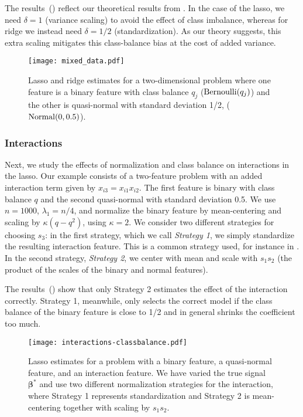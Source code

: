 The results~() reflect our theoretical results from
. In the case of the lasso, we need \(\delta =1\) (variance scaling) to
avoid the effect of class imbalance, whereas for ridge we instead need \(\delta =1/2\)
(standardization). As our theory suggests, this extra scaling mitigates this class-balance
bias at the cost of added variance.

\begin{figure}[htpb]
  \centering
  \texttt{[image: mixed\_data.pdf]}
  \caption{%
    Lasso and ridge estimates for a two-dimensional problem where one feature is a binary
    feature with class balance \(q_j\) (\(\operatorname{Bernoulli}(q_j)\)) and the other is quasi-normal
    with standard deviation 1/2, (\(\operatorname{Normal}(0, 0.5)\)).
  }
  \label{fig:lasso-ridge-comparison}
\end{figure}

\subsubsection{Interactions}\label{sec:experiments-interactions}

Next, we study the effects of normalization and class balance on interactions in the lasso.
Our example consists of a two-feature problem with an added interaction term given by
\(x_{i3} = x_{i1}x_{i2}\). The first feature is binary with class balance \(q\) and the
second quasi-normal with standard deviation 0.5. We use \(n=1000\), \(\lambda_1 = n/4\),
and normalize the binary feature by mean-centering and scaling by \(\kappa (q - q^2)\),
using \(\kappa = 2\). We consider two different strategies for choosing \(s_3\): in the
first strategy, which we call \emph{Strategy 1}, we simply standardize the resulting
interaction feature. This is a common strategy used, for instance in
\citet{bien2013,lim2015}. In the second strategy, \emph{Strategy 2}, we center with mean
and scale with \(s_1s_2\) (the product of the scales of the binary and normal features).

The results~() show that only Strategy 2 estimates the effect of the
interaction correctly. Strategy 1, meanwhile, only selects the correct model if the class
balance of the binary feature is close to 1/2 and in general shrinks the coefficient too
much.

\begin{figure}[htpb]
  \centering
  \texttt{[image: interactions-classbalance.pdf]}
  \caption{%
    Lasso estimates for a problem with a binary feature, a quasi-normal
    feature, and an interaction feature. We have varied the true signal
    \(\bm{\beta}^*\) and use two different normalization strategies for the
    interaction, where
    Strategy 1 represents standardization and Strategy 2 is mean-centering
    together with scaling by \(s_1 s_2\).
  }
  \label{fig:interactions}
\end{figure}

